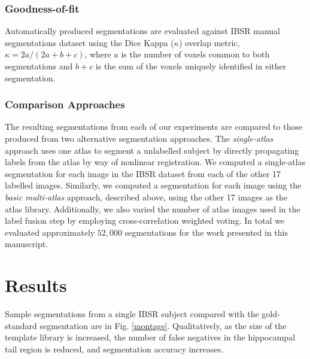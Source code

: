 \documentclass{article}\usepackage[]{graphicx}\usepackage[]{color}
\begin{document}
\subsubsection{Goodness-of-fit}
Automatically produced segmentations are evaluated against IBSR manual
segmentations dataset using the Dice Kappa ($\kappa$) overlap metric, $\kappa =
{2a}/{(2a+b+c)}$, where $a$ is the number of voxels common to both
segmentations and $b+c$ is the sum of the voxels uniquely identified in either
segmentation.

\subsubsection{Comparison Approaches}
The resulting segmentations from each of our experiments are compared to those
produced from two alternative segmentation approaches. The {\it single-atlas}
approach uses one atlas to segment a unlabelled subject by directly propagating
labels from the atlas by way of nonlinear registration.  We computed a
single-atlas segmentation for each image in the IBSR dataset from each of the
other 17 labelled images.  Similarly, we computed a segmentation for each image
using the {\it basic multi-atlas} approach, described above, using the
other 17 images as the atlas library.  Additionally, we also varied the number
of atlas images used in the label fusion step by employing cross-correlation
weighted voting.  In total we evaluated approximately $52,000$ segmentations
for the work presented in this manuscript.

\section{Results}

Sample segmentations from a single IBSR subject compared with the gold-standard
segmentation are in Fig.  \ref{montage}.  Qualitatively, as the size of the
template library is increased, the number of false negatives in the hippocampal
tail region is reduced, and segmentation accuracy increases.
\end{document}
